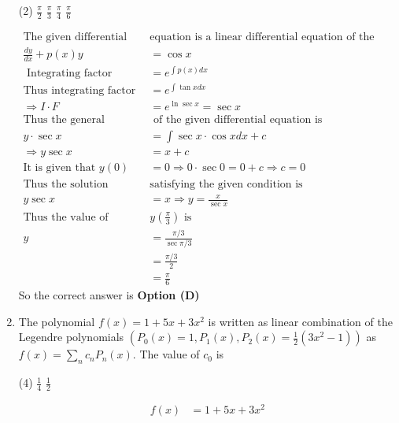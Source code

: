 \begin{enumerate}[label=\color{ocre}\textbf{\arabic*.}]
{}
\begin{tasks}(2)
	\task[\textbf{a.}]$\frac{\pi}{2}$  
	\task[\textbf{b.}]$\frac{\pi}{3}$
	\task[\textbf{c.}]$\frac{\pi}{4}$ 
	\task[\textbf{d.}]$\frac{\pi}{6}$ 
\end{tasks}
\begin{answer}
	$$
	\begin{aligned}
	\text{The given differential }&\text{equation is a linear differential equation of the form}\\
	\frac{d y}{d x}+p(x) y&=\cos x\\
	\text{	Integrating factor }&=e^{\int p(x) d x}\\
	\text{Thus integrating factor }&=e^{\int \tan x d x}\\
	\Rightarrow I \cdot F&=e^{\ln \sec x}=\sec x\\
	\text{Thus the general solution}&\text{ of the given differential equation is}\\
	y \cdot \sec x&=\int \sec x \cdot \cos x d x+c\\
	\Rightarrow y \sec x&=x+c\\
	\text{It is given that }y(0)&=0 \Rightarrow 0 \cdot \sec 0=0+c \Rightarrow c=0\\
	\text{Thus the solution }&\text{satisfying the given condition is}\\
	y \sec x&=x \Rightarrow y=\frac{x}{\sec x}\\
	\text{Thus the value of }&y\left(\frac{\pi}{3}\right)\text{ is}\\
	y&=\frac{\pi / 3}{\sec \pi / 3} \\&=\frac{\pi / 3}{2}\\&=\frac{\pi}{6}
	\end{aligned}
	$$
	So the correct answer is \textbf{Option (D)}
\end{answer}
\item The polynomial $f(x)=1+5 x+3 x^{2}$ is written as linear combination of the Legendre polynomials
$\left(P_{0}(x)=1, P_{1}(x), P_{2}(x)=\frac{1}{2}\left(3 x^{2}-1\right)\right)$ as $f(x)=\sum_{n} c_{n} P_{n}(x)$. The value of $c_{0}$ is
{}
\begin{tasks}(4)
	\task[\textbf{A.}] $\frac{1}{4}$
	\task[\textbf{B.}] $\frac{1}{2}$
\end{tasks}
\begin{answer}
	$$
	\begin{aligned}
	f(x)&=1+5 x+3 x^{2}\\

\end{aligned}$$
\end{answer}
\end{enumerate}
